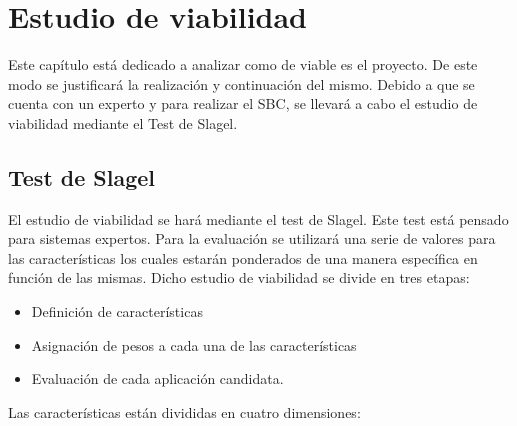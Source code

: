 \chapter{Estudio de viabilidad}
\label{cap: Introducción y objetivos}

Este capítulo está dedicado a analizar como de viable es el proyecto. De este modo
se justificará la realización y continuación del mismo. Debido a que se cuenta con
un experto y para realizar el \acs{SBC}, se llevará a cabo
el estudio de viabilidad mediante el Test de Slagel.

\section{Test de Slagel}

El estudio de viabilidad se hará mediante el test de Slagel.
Este test está pensado para sistemas expertos. Para la evaluación se utilizará una serie
de valores para las características los cuales estarán ponderados de una manera
específica en función de las mismas. Dicho estudio de viabilidad se divide en tres etapas:

\begin{itemize}
  \item Definición de características
  \item Asignación de pesos a cada una de las características
  \item Evaluación de cada aplicación candidata.
\end{itemize}

Las características están divididas en cuatro dimensiones:

